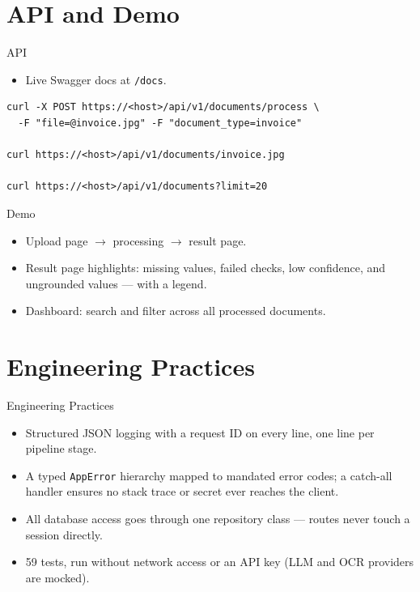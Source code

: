 \documentclass[11pt]{beamer}
\begin{document}
\section{API and Demo}
\begin{frame}[fragile]{API}
  \begin{itemize}
    \item Live Swagger docs at \texttt{/docs}.
  \end{itemize}
  \begin{lstlisting}
curl -X POST https://<host>/api/v1/documents/process \
  -F "file=@invoice.jpg" -F "document_type=invoice"

curl https://<host>/api/v1/documents/invoice.jpg

curl https://<host>/api/v1/documents?limit=20
  \end{lstlisting}
\end{frame}

\begin{frame}{Demo}
  \begin{itemize}
    \item Upload page $\rightarrow$ processing $\rightarrow$ result page.
    \item Result page highlights: missing values, failed checks, low confidence, and
      ungrounded values --- with a legend.
    \item Dashboard: search and filter across all processed documents.
  \end{itemize}
\end{frame}

\section{Engineering Practices}
\begin{frame}{Engineering Practices}
  \begin{itemize}
    \item Structured JSON logging with a request ID on every line, one line per
      pipeline stage.
    \item A typed \texttt{AppError} hierarchy mapped to mandated error codes; a
      catch-all handler ensures no stack trace or secret ever reaches the client.
    \item All database access goes through one repository class --- routes never
      touch a session directly.
    \item 59 tests, run without network access or an API key (LLM and OCR providers
      are mocked).
  \end{itemize}
\end{frame}
\end{document}
